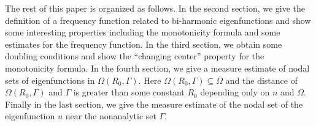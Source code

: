 \documentclass[a4paper, 12pt, onecolumn]{article} \textwidth 148mm
\begin{document}
The rest of this paper is organized as follows. In the second section, we give the definition of a frequency function related to bi-harmonic eigenfunctions and show some interesting properties including the monotonicity formula and some estimates for the frequency function. In the third section, we obtain some doubling conditions and show the ``changing center'' property for the monotonicity formula. In the fourth section, we give a measure estimate of nodal sets of eigenfunctions in $\Omega(R_0,\Gamma)$. Here $\Omega(R_0,\Gamma)\subseteq\overline{\Omega}$
 and the distance of $\Omega(R_0,\Gamma)$ and $\Gamma$ is greater than some constant $R_0$
 depending only on $n$ and $\Omega$.  Finally in the last section, we give the measure estimate of the nodal set of the eigenfunction $u$ near the nonanalytic set $\Gamma$.



\end{document}
